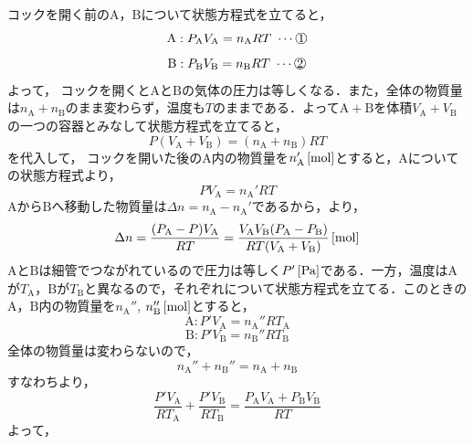 \begin{reidaiunit}
\begin{kaitou}
\begin{komon}
 コックを開く前の$\mathrm{A}$，$\mathrm{B}$について状態方程式を立てると，
       \[\mathrm{A}:P_{\mathrm{A}}V_{\mathrm{A}}=n_{\mathrm{A}}RT\Eq{1}\]
       \[\mathrm{B}:P_{\mathrm{B}}V_{\mathrm{B}}=n_{\mathrm{B}}RT\Eq{2}\]
       よって，
 コックを開くと$\mathrm{A}$と$\mathrm{B}$の気体の圧力は等しくなる．また，全体の物質量は$n_{\mathrm{A}}+n_{\mathrm{B}}$のまま変わらず，温度も$T$のままである．よって$\mathrm{A}+\mathrm{B}$を体積$V_{\mathrm{A}}+V_{\mathrm{B}}$の一つの容器とみなして状態方程式を立てると，
       \[P(V_{\mathrm{A}}+V_{\mathrm{B}})=(n_{\mathrm{A}}+n_{\mathrm{B}})RT\]
       を代入して，
 コックを開いた後の$\mathrm{A}$内の物質量を$n_{\mathrm{A}}'\,[\mathrm{mol}]$とすると，$\mathrm{A}$についての状態方程式より，
       \[PV_{\mathrm{A}}=n_{\mathrm{A}}'RT\]
       $\mathrm{A}$から$\mathrm{B}$へ移動した物質量は$\Delta n=n_{\mathrm{A}}-n_{\mathrm{A}}'$であるから，より，
       \[\Delta n=\frac{(P_{\mathrm{A}}-P)V_{\mathrm{A}}}{RT}=\frac{V_{\mathrm{A}}V_{\mathrm{B}}(P_{\mathrm{A}}-P_{\mathrm{B}})}{RT(V_{\mathrm{A}}+V_{\mathrm{B}})}\,[\mathrm{mol}]\]
       \hspace*{\fill}\Ans
{} $\mathrm{A}$と$\mathrm{B}$は細管でつながれているので圧力は等しく$P'\,[\mathrm{Pa}]$である．一方，温度は$\mathrm{A}$が$T_{\mathrm{A}}$，$\mathrm{B}$が$T_{\mathrm{B}}$と異なるので，それぞれについて状態方程式を立てる．このときの$\mathrm{A}$，$\mathrm{B}$内の物質量を$n_{\mathrm{A}}''$, $n_{\mathrm{B}}''\,[\mathrm{mol}]$とすると，
       \[\mathrm{A}:P'V_{\mathrm{A}}=n_{\mathrm{A}}''RT_{\mathrm{A}}\]
       \[\mathrm{B}:P'V_{\mathrm{B}}=n_{\mathrm{B}}''RT_{\mathrm{B}}\]
       \hspace{1zw}全体の物質量は変わらないので，
       \[n_{\mathrm{A}}''+n_{\mathrm{B}}''=n_{\mathrm{A}}+n_{\mathrm{B}}\]
       すなわちより，
       \[\frac{P'V_{\mathrm{A}}}{RT_{\mathrm{A}}}+\frac{P'V_{\mathrm{B}}}{RT_{\mathrm{B}}}=\frac{P_{\mathrm{A}}V_{\mathrm{A}}+P_{\mathrm{B}}V_{\mathrm{B}}}{RT}\]
       よって，
\end{komon}
\end{kaitou}
\end{reidaiunit}
 
